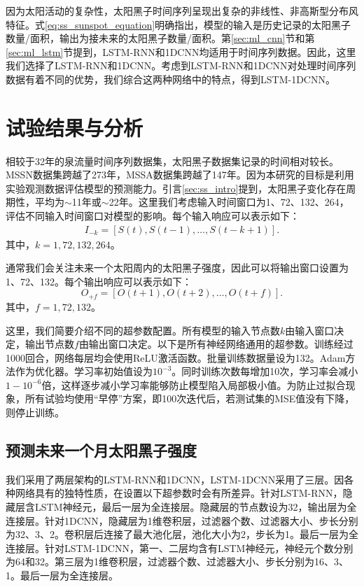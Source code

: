 因为太阳活动的复杂性，太阳黑子时间序列呈现出复杂的非线性、非高斯型分布风特征。式\ref{eq:ss_sunspot_equation}明确指出，模型的输入是历史记录的太阳黑子数量/面积，输出为接未来的太阳黑子数量/面积。第\ref{sec:ml_cnn}节和第\ref{sec:ml_lstm}节提到，LSTM-RNN和1DCNN均适用于时间序列数据。因此，这里我们选择了LSTM-RNN和1DCNN。考虑到LSTM-RNN和1DCNN对处理时间序列数据有着不同的优势，我们综合这两种网络中的特点，得到LSTM-1DCNN。

\section{试验结果与分析}\label{sec:ss_result}

相较于32年的泉流量时间序列数据集，太阳黑子数据集记录的时间相对较长。MSSN数据集跨越了273年，MSSA数据集跨越了147年。因为本研究的目标是利用实验观测数据评估模型的预测能力。引言\ref{sec:ss_intro}提到，太阳黑子变化存在周期性，平均为$\sim$11年或$\sim$22年。这里我们考虑输入时间窗口为1、72、132、264，评估不同输入时间窗口对模型的影响。每个输入响应可以表示如下：
\begin{equation}
  \label{eq:ss_input}
  \begin{split}
    I_{-k}=[S(t),S(t-1),\ldots,S(t-k+1)].
  \end{split}
\end{equation}
其中，$k=1,72,132,264$。

通常我们会关注未来一个太阳周内的太阳黑子强度，因此可以将输出窗口设置为1、72、132。每个输出响应可以表示如下：
\begin{equation}
  \label{eq:ss_output}
  O_{+f}=[O(t+1),O(t+2),\ldots,O(t+f)].
\end{equation}
其中，$f=1,72,132$。

这里，我们简要介绍不同的超参数配置。所有模型的输入节点数$k$由输入窗口决定，输出节点数$f$由输出窗口决定。以下是所有神经网络通用的超参数。训练经过1000回合，网络每层均会使用ReLU激活函数。批量训练数据量设为132。Adam方法作为优化器。学习率初始值设为$10^{-3}$。同时训练次数每增加10次，学习率会减小$1-10^{-6}$倍，这样逐步减小学习率能够防止模型陷入局部极小值。为防止过拟合现象，所有试验均使用“早停”方案，即100次迭代后，若测试集的MSE值没有下降，则停止训练。

\subsection{预测未来一个月太阳黑子强度}\label{sec:ss_result_one}

我们采用了两层架构的LSTM-RNN和1DCNN，LSTM-1DCNN采用了三层。因各种网络具有的独特性质，在设置以下超参数时会有所差异。针对LSTM-RNN，隐藏层含LSTM神经元，最后一层为全连接层。隐藏层的节点数设为32，输出层为全连接层。针对1DCNN，隐藏层为1维卷积层，过滤器个数、过滤器大小、步长分别为32、3、2。卷积层后连接了最大池化层，池化大小为2，步长为1。最后一层为全连接层。针对LSTM-1DCNN，第一、二层均含有LSTM神经元，神经元个数分别为64和32。第三层为1维卷积层，过滤器个数、过滤器大小、步长分别为16、3、1。最后一层为全连接层。 

